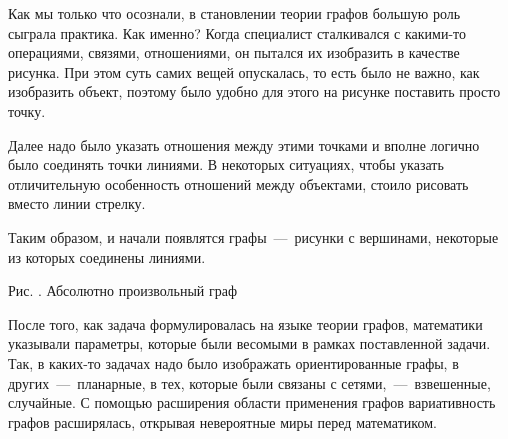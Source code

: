 \begin{paracol}{2}
	Как мы только что осознали, в становлении теории графов большую роль сыграла практика. Как именно? Когда специалист сталкивался с 
	какими-то операциями, связями, отношениями, он пытался их изобразить в качестве рисунка. При этом суть самих вещей опускалась, 
	то есть было не важно, как изобразить объект, поэтому было удобно для этого на рисунке поставить просто точку.
	
	Далее надо было указать отношения между этими точками и вполне логично было соединять точки линиями. 
	В некоторых ситуациях, чтобы указать отличительную особенность отношений между объектами, стоило рисовать вместо линии стрелку.
	
	Таким образом, и начали появлятся графы~---~рисунки с вершинами, некоторые из которых соединены линиями.
	 
\switchcolumn

\begin{center}
	\small Рис. \images. Абсолютно произвольный граф 
\end{center} \end{paracol}
	
	После того, как задача формулировалась на языке теории графов, математики указывали параметры, которые были весомыми 
	в рамках поставленной задачи. Так, в каких-то задачах надо было изображать ориентированные графы, в других~---~планарные, 
	в тех, которые были связаны с сетями,~---~взвешенные, случайные. С помощью расширения области применения графов вариативность 
	графов расширялась, открывая невероятные миры перед математиком.	 

